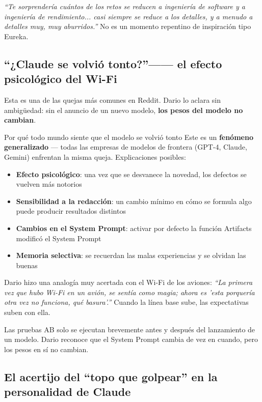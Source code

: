 \textit{``Te sorprendería cuántos de los retos se reducen a ingeniería de software y a ingeniería de rendimiento... casi siempre se reduce a los detalles, y a menudo a detalles muy, muy aburridos.''} No es un momento repentino de inspiración tipo Eureka.

\subsection{``¿Claude se volvió tonto?''—— el efecto psicológico del Wi-Fi}

Esta es una de las quejas más comunes en Reddit. Dario lo aclara sin ambigüedad: sin el anuncio de un nuevo modelo, \textbf{los pesos del modelo no cambian}.

\begin{warningbox}{Por qué todo mundo siente que el modelo se volvió tonto}
Este es un \textbf{fenómeno generalizado} — todas las empresas de modelos de frontera (GPT-4, Claude, Gemini) enfrentan la misma queja. Explicaciones posibles:

\begin{itemize}
    \item \textbf{Efecto psicológico}: una vez que se desvanece la novedad, los defectos se vuelven más notorios
    \item \textbf{Sensibilidad a la redacción}: un cambio mínimo en cómo se formula algo puede producir resultados distintos
    \item \textbf{Cambios en el System Prompt}: activar por defecto la función Artifacts modificó el System Prompt
    \item \textbf{Memoria selectiva}: se recuerdan las malas experiencias y se olvidan las buenas
\end{itemize}

Dario hizo una analogía muy acertada con el Wi-Fi de los aviones: \textit{``La primera vez que hubo Wi-Fi en un avión, se sentía como magia; ahora es 'esta porquería otra vez no funciona, qué basura'.''} Cuando la línea base sube, las expectativas suben con ella.

Las pruebas AB solo se ejecutan brevemente antes y después del lanzamiento de un modelo. Dario reconoce que el System Prompt cambia de vez en cuando, pero los pesos en sí no cambian.
\end{warningbox}

\subsection{El acertijo del ``topo que golpear'' en la personalidad de Claude}

